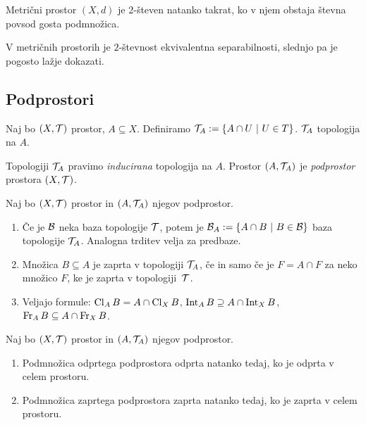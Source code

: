 \begin{izrek}
    Metrični prostor $(X, d)$ je $2$-števen natanko takrat, ko v njem obstaja števna povsod gosta podmnožica.
\end{izrek}

\begin{opomba}
    V metričnih prostorih je $2$-števnost ekvivalentna separabilnosti, slednjo pa je pogosto lažje dokazati.
\end{opomba}

\subsection{Podprostori}

Naj bo $(X, \mathcal{T})$ prostor, $A \subseteq X$. Definiramo $\mathcal{T}_A := \left\{A \cap U \ | \ U \in T\right\}$. $\mathcal{T}_A$ topologija na $A$.

\begin{definicija}
    Topologiji $\mathcal{T}_A$ pravimo \emph{inducirana} topologija na $A$.
    Prostor $(A, \mathcal{T}_A)$ je \emph{podprostor} prostora $(X, \mathcal{T})$.
\end{definicija}

\begin{trditev}
    Naj bo $(X, \mathcal{T})$ prostor in $(A, \mathcal{T}_A)$ njegov podprostor.
    \begin{enumerate}
        \item Če je $\mathcal{B}$ neka baza topologije $\mathcal{T}$, potem je $\mathcal{B}_A := \left\{A \cap B \ | \ B \in \mathcal{B}\right\}$ baza topologije $\mathcal{T}_A$. Analogna trditev velja za predbaze.
        \item Množica $B \subseteq A$ je zaprta v topologiji $\mathcal{T}_A$, če in samo če je $F = A \cap F$ za neko množico $F$, ke je zaprta v topologiji~$\mathcal{T}$.
        \item Veljajo formule: $\operatorname{Cl}_A B = A \cap \operatorname{Cl}_X B$, $\operatorname{Int}_A B \supseteq A \cap \operatorname{Int}_X B$, $\operatorname{Fr}_A B \subseteq A \cap \operatorname{Fr}_X B$.
    \end{enumerate}    
\end{trditev}

\begin{trditev}
    Naj bo $(X, \mathcal{T})$ prostor in $(A, \mathcal{T}_A)$ njegov podprostor.
    \begin{enumerate}
        \item Podmnožica odprtega podprostora odprta natanko tedaj, ko je odprta v celem prostoru.
        \item Podmnožica zaprtega podprostora zaprta natanko tedaj, ko je zaprta v celem prostoru.
    \end{enumerate}
\end{trditev}

